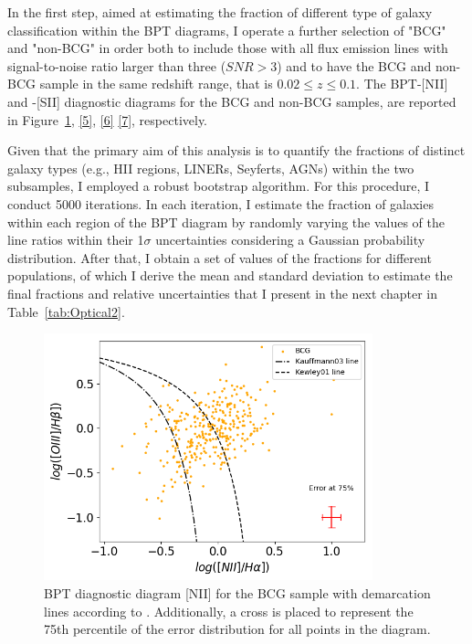 In the first step, aimed at estimating the fraction of different type of galaxy classification within the BPT diagrams, I operate a further selection of "BCG" and "non-BCG" in order both to include those with all flux emission lines with signal-to-noise ratio larger than three ($SNR>3$) and to have the BCG and non-BCG sample in the same redshift range, that is $0.02 \leq z \leq 0.1$.
The BPT-[NII] and -[SII] diagnostic diagrams for the BCG and non-BCG samples, are reported in Figure~\ref{4}, \ref{5}, \ref{6}  \ref{7}, respectively.

Given that the primary aim of this analysis is to quantify the fractions of distinct galaxy types (e.g., HII regions, LINERs, Seyferts, AGNs) within the two subsamples, I employed a robust bootstrap algorithm. For this procedure, I conduct 5000 iterations. In each iteration, I estimate the fraction of galaxies within each region of the BPT diagram by randomly varying the values of the line ratios within their 1$\sigma$ uncertainties considering a Gaussian probability distribution. After that, I obtain a set of values of the fractions for different populations, of which I derive the mean and standard deviation to estimate the final fractions and relative uncertainties that I present in the next chapter in Table~\ref{tab:Optical2}.

\vspace{2cm}
\begin{figure}[hbtp]
  \centering
  \includegraphics[width=0.85\textwidth]{BCG-NII-V22}
  \caption{BPT diagnostic diagram [NII] for the BCG sample with demarcation lines according to \cite{2006MNRAS.372..961K}.
  Additionally, a cross is placed to represent the 75th percentile of the error distribution for all points in the diagram.  }
  \label{4}
\end{figure}

